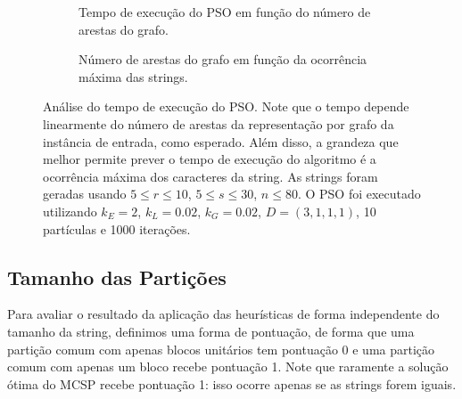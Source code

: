         \begin{figure}[htb]
            \centering
            \begin{subfigure}[b]{0.49\textwidth}
                \centering

                \caption{Tempo de execução do PSO em função do número de arestas do grafo.}
                \label{fig:tempo-pso-vs-arestas}
            \end{subfigure}%
            \hfill%
            \begin{subfigure}[b]{0.49\textwidth}
                \centering

                \caption{Número de arestas do grafo em função da ocorrência máxima das strings.}
                \label{fig:tempo-pso-arestas-vs-occ}
            \end{subfigure}

            \caption{Análise do tempo de execução do PSO. Note que o tempo depende linearmente do número de arestas da representação por grafo da instância de entrada, como esperado. Além disso, a grandeza que melhor permite prever o tempo de execução do algoritmo é a ocorrência máxima dos caracteres da string. As strings foram geradas usando $5 \leq r \leq 10$, $5 \leq s \leq 30$, $n \leq 80$. O PSO foi executado utilizando $k_E = 2$, $k_L = 0.02$, $k_G = 0.02$, $D = (3, 1, 1, 1)$, 10 partículas e 1000 iterações.}
            \label{fig:tempo-pso}
        \end{figure}

\subsection{Tamanho das Partições} \label{sec:resultados-tamanho}

    Para avaliar o resultado da aplicação das heurísticas de forma independente do tamanho da string, definimos uma forma de pontuação, de forma que uma partição comum com apenas blocos unitários tem pontuação 0 e uma partição comum com apenas um bloco recebe pontuação 1. Note que raramente a solução ótima do MCSP recebe pontuação 1: isso ocorre apenas se as strings forem iguais.

